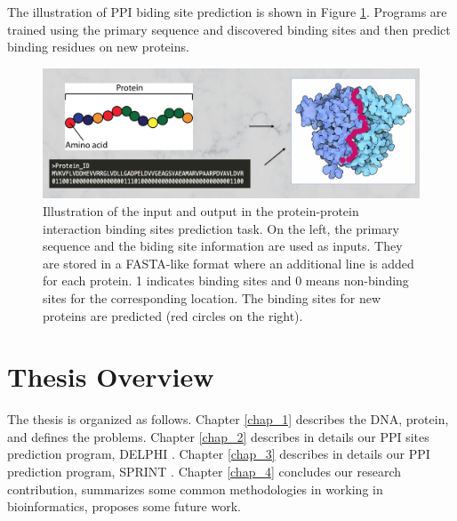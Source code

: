 The illustration of PPI biding site prediction is shown in Figure \ref{fig_ppi_bind_work_flow}. Programs are trained using the primary sequence and discovered binding sites and then predict binding residues on new proteins.
\begin{figure}[h!]
\begin{center}
\includegraphics[width = 15cm]{img/PPI_site_pred_input.png}
\end{center}
\caption[Illustration of protein-protein interaction binding sites prediction]{Illustration of the input and output in the protein-protein interaction binding sites prediction task. On the left, the primary sequence and the biding site information are used as inputs. They are stored in a FASTA-like format where an additional line is added for each protein. 1 indicates binding sites and 0 means non-binding sites for the corresponding location. The binding sites for new proteins are predicted (red circles on the right). \label{fig_ppi_bind_work_flow}}
\end{figure}

\section{Thesis Overview}
The thesis is organized as follows. Chapter \ref{chap_1} describes the DNA, protein, and defines the problems. Chapter \ref{chap_2} describes in details our PPI sites prediction program, DELPHI \cite{li2020delphi, li2020delphi_ISMB}. Chapter \ref{chap_3} describes in details our PPI prediction program, SPRINT \cite{li2017sprint, li2020predicting}. Chapter \ref{chap_4} concludes our research contribution, summarizes some common methodologies in working in bioinformatics, proposes some future work.
